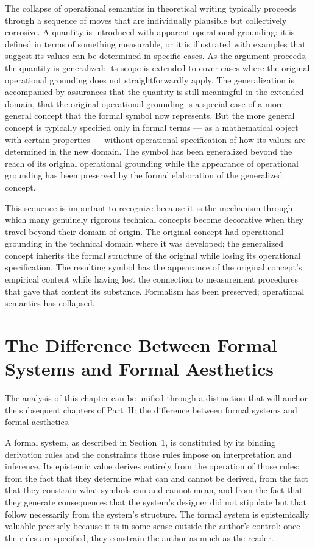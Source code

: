 \documentclass[12pt, openright, twoside]{book}
\begin{document}
The collapse of operational semantics in theoretical writing
typically proceeds through a sequence of moves that are
individually plausible but collectively corrosive. A quantity
is introduced with apparent operational grounding: it is
defined in terms of something measurable, or it is illustrated
with examples that suggest its values can be determined in
specific cases. As the argument proceeds, the quantity is
generalized: its scope is extended to cover cases where the
original operational grounding does not straightforwardly apply.
The generalization is accompanied by assurances that the
quantity is still meaningful in the extended domain, that
the original operational grounding is a special case of a
more general concept that the formal symbol now represents.
But the more general concept is typically specified only in
formal terms --- as a mathematical object with certain
properties --- without operational specification of how
its values are determined in the new domain. The symbol
has been generalized beyond the reach of its original
operational grounding while the appearance of operational
grounding has been preserved by the formal elaboration
of the generalized concept.

This sequence is important to recognize because it is the
mechanism through which many genuinely rigorous technical
concepts become decorative when they travel beyond their
domain of origin. The original concept had operational
grounding in the technical domain where it was developed;
the generalized concept inherits the formal structure of
the original while losing its operational specification.
The resulting symbol has the appearance of the original
concept's empirical content while having lost the
connection to measurement procedures that gave that
content its substance. Formalism has been preserved;
operational semantics has collapsed.

\section{The Difference Between Formal Systems and Formal Aesthetics}

The analysis of this chapter can be unified through a distinction
that will anchor the subsequent chapters of Part~II: the difference
between formal systems and formal aesthetics.

A formal system, as described in Section~1, is constituted by its
binding derivation rules and the constraints those rules impose
on interpretation and inference. Its epistemic value derives entirely
from the operation of those rules: from the fact that they determine
what can and cannot be derived, from the fact that they constrain
what symbols can and cannot mean, and from the fact that they
generate consequences that the system's designer did not stipulate
but that follow necessarily from the system's structure. The formal
system is epistemically valuable precisely because it is in some
sense outside the author's control: once the rules are specified,
they constrain the author as much as the reader.
\end{document}
